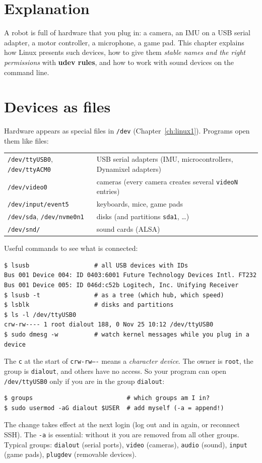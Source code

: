 \label{ch:linux6}

\section*{Explanation}
A robot is full of hardware that you plug in: a camera, an IMU on a USB serial adapter, a motor controller, a microphone, a game pad. This chapter explains how Linux presents such devices, how to give them \emph{stable names and the right permissions} with \textbf{udev rules}, and how to work with sound devices on the command line.

\section*{Devices as files}
Hardware appears as special files in \texttt{/dev} (Chapter~\ref{ch:linux1}). Programs open them like files:
\begin{center}
\renewcommand{\arraystretch}{1.15}
\begin{tabular}{p{5.0cm}p{8.4cm}}
\texttt{/dev/ttyUSB0}, \texttt{/dev/ttyACM0} & USB serial adapters (IMU, microcontrollers, Dynamixel adapters)\\
\texttt{/dev/video0} & cameras (every camera creates several \texttt{videoN} entries)\\
\texttt{/dev/input/event5} & keyboards, mice, game pads\\
\texttt{/dev/sda}, \texttt{/dev/nvme0n1} & disks (and partitions \texttt{sda1}, \dots)\\
\texttt{/dev/snd/} & sound cards (ALSA)\\
\end{tabular}
\end{center}
Useful commands to see what is connected:
\begin{verbatim}
$ lsusb                  # all USB devices with IDs
Bus 001 Device 004: ID 0403:6001 Future Technology Devices Intl. FT232
Bus 001 Device 005: ID 046d:c52b Logitech, Inc. Unifying Receiver
$ lsusb -t               # as a tree (which hub, which speed)
$ lsblk                  # disks and partitions
$ ls -l /dev/ttyUSB0
crw-rw---- 1 root dialout 188, 0 Nov 25 10:12 /dev/ttyUSB0
$ sudo dmesg -w          # watch kernel messages while you plug in a device
\end{verbatim}
The \texttt{c} at the start of \texttt{crw-rw----} means a \emph{character device}. The owner is \texttt{root}, the group is \texttt{dialout}, and others have no access. So your program can open \texttt{/dev/ttyUSB0} only if you are in the group \texttt{dialout}:
\begin{verbatim}
$ groups                          # which groups am I in?
$ sudo usermod -aG dialout $USER  # add myself (-a = append!)
\end{verbatim}
The change takes effect at the next login (log out and in again, or reconnect SSH). The \texttt{-a} is essential: without it you are removed from all other groups. Typical groups: \texttt{dialout} (serial ports), \texttt{video} (cameras), \texttt{audio} (sound), \texttt{input} (game pads), \texttt{plugdev} (removable devices).


